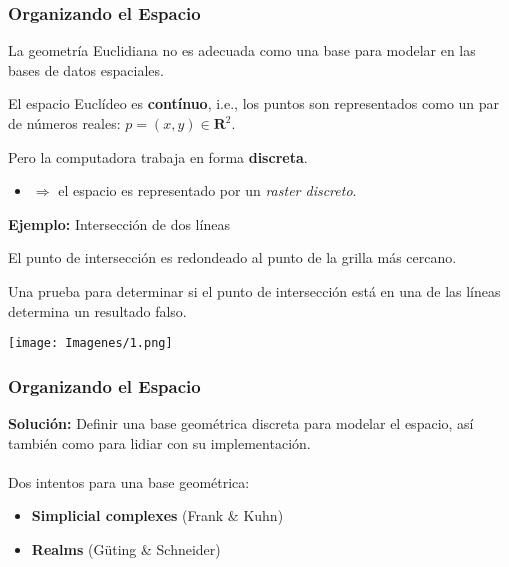 \documentclass[12pt]{beamer}
\begin{document}
\begin{frame}
\frametitle{Organizando el Espacio}
La geometr\'ia Euclidiana no es adecuada como una base para modelar en las bases de datos espaciales.\\
\begin{itemize}
\begin{small}
\item El espacio Eucl\'ideo es \textbf{cont\'inuo}, i.e., los puntos son representados como un par de n\'umeros reales: $p = (x,y) \in \mathbf{R}^{2}$.
\item Pero la computadora trabaja en forma \textbf{discreta}.
\begin{itemize}
\item $\Rightarrow$ el espacio es representado por un \textit{raster discreto}.
\end{itemize}
\end{small}
\end{itemize}
\textbf{Ejemplo:} Intersecci\'on de dos l\'ineas
\begin{itemize}
\begin{small}
\item El punto de intersecci\'on es redondeado al punto de la grilla m\'as cercano.
\item Una prueba para determinar si el punto de intersecci\'on est\'a en una de las l\'ineas determina un resultado falso.
\end{small}
\end{itemize}
\begin{center}
\texttt{[image: Imagenes/1.png]}
\end{center}

\end{frame}

\begin{frame}
\frametitle{Organizando el Espacio}
\textbf{Soluci\'on:} Definir una base geom\'etrica discreta para modelar el espacio, as\'i tambi\'en como para lidiar con su implementaci\'on.\\
\ \\
Dos intentos para una base geom\'etrica:\\
\begin{itemize}
\item \textbf{Simplicial complexes} (Frank \& Kuhn)
\item \textbf{Realms} (G\"uting \& Schneider)
\end{itemize}
\end{frame}
\end{document}
